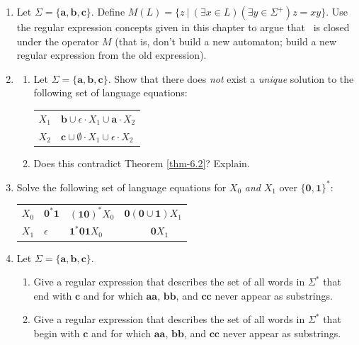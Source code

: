 \begin{enumerate}[{6.}1.]
\item Let $\Sigma=\{\pmb{a},\pmb{b},\pmb{c}\}$. Define $M(L)=\{z\ |\ (\exists x
\in L)(\exists y \in\Sigma^+)z = xy\}$. Use the regular expression concepts
given in this chapter to argue that \RSIG\ is closed under the operator $M$
(that is, don't build a new automaton; build a new regular expression from the
old expression).

\item \begin{enumerate}
\item Let $\Sigma=\{\pmb{a},\pmb{b},\pmb{c}\}$. Show that there does \emph{not}
exist a \emph{unique} solution to the following set of language equations:
\begin{center}\begin{tabular}{r@{ = }l}
$X_1$ & $\pmb{b}\cup\epsilon\cdot X_1\cup\pmb{a}\cdot X_2$ \\
$X_2$ & $\pmb{c}\cup\emptyset\cdot X_1 \cup\epsilon\cdot X_2$
\end{tabular}\end{center}
\item Does this contradict Theorem \ref{thm-6.2}? Explain.
\end{enumerate}

\item Solve the following set of language equations for $X_0$ \emph{and} $X_1$ over
$\{\pmb{0},\pmb{1}\}^*$:
\begin{center}\begin{tabular}{r@{ = }l@{ $\cup$ }l@{ $\cup$ }l}
$X_0$ & $\pmb{0}^*\pmb{1}$ & $(\pmb{10})^*X_0$ & $\pmb{0}(\pmb{0}\cup\pmb{1})X_1$ \\
$X_1$ & $\epsilon$ & $\pmb{1}^*\pmb{01} X_0$ & $\qquad\ \ \ \pmb{0}X_1$
\end{tabular}\end{center}

\item Let $\Sigma=\{\pmb{a},\pmb{b},\pmb{c}\}$.
\begin{enumerate}
\item Give a regular expression that describes the set of all words in $\Sigma^*$
that end with $\pmb{c}$ and for which $\pmb{aa}$, $\pmb{bb}$, and $\pmb{cc}$ never
appear as substrings.
\item Give a regular expression that describes the set of all words in $\Sigma^*$
that begin with $\pmb{c}$ and for which $\pmb{aa}$, $\pmb{bb}$, and $\pmb{cc}$ never
appear as substrings.
\end{enumerate}


\end{enumerate}
